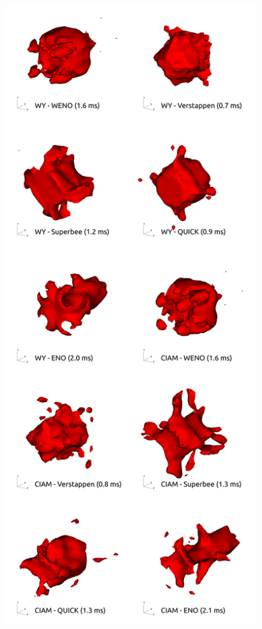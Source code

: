 \begin{figure}
\begin{center}
\includegraphics[width = 1.0\textwidth]{plots/raindrop/combined_failures_raindrop.png}

\end{center}
\end{figure}
